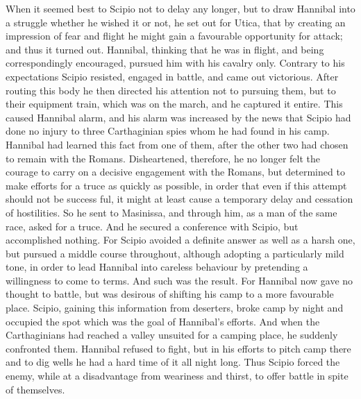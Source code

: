 When it seemed best to Scipio not to delay any longer, but to draw Hannibal into a struggle whether he wished it or not, he set out for Utica, that by creating an impression of fear and flight he might gain a favourable opportunity for attack; and thus it turned out. Hannibal, thinking that he was in flight, and being correspondingly encouraged, pursued him with his cavalry only. Contrary to his expectations Scipio resisted, engaged in battle, and came out victorious. After routing this body he then directed his attention not to pursuing them, but to their equipment train, which was on the march, and he captured it entire. This caused Hannibal alarm, and his alarm was increased by the news that Scipio had done no injury to three Carthaginian spies whom he had found in his camp. Hannibal had learned this fact from one of them, after the other two had chosen to remain with the Romans. Disheartened, therefore, he no longer felt the courage to carry on a decisive engagement with the Romans, but determined to make efforts for a truce as quickly as possible, in order that even if this attempt should not be success ­ful, it might at least cause a temporary delay and cessation of hostilities. So he sent to Masinissa, and through him, as a man of the same race, asked for a truce. And he secured a conference with Scipio, but accomplished nothing. For Scipio avoided a definite answer as well as a harsh one, but pursued a middle course throughout, although adopting a particularly mild tone, in order to lead Hannibal into careless behaviour by pretending a willingness to come to terms. And such was the result. For Hannibal now gave no thought to battle, but was desirous of shifting his camp to a more favourable place. Scipio, gaining this information from deserters, broke camp by night and occupied the spot which was the goal of Hannibal's efforts. And when the Carthaginians had reached a valley unsuited for a camping place, he suddenly confronted them. Hannibal refused to fight, but in his efforts to pitch camp there and to dig wells he had a hard time of it all night long. Thus Scipio forced the enemy, while at a disadvantage from weariness and thirst, to offer battle in spite of themselves.

